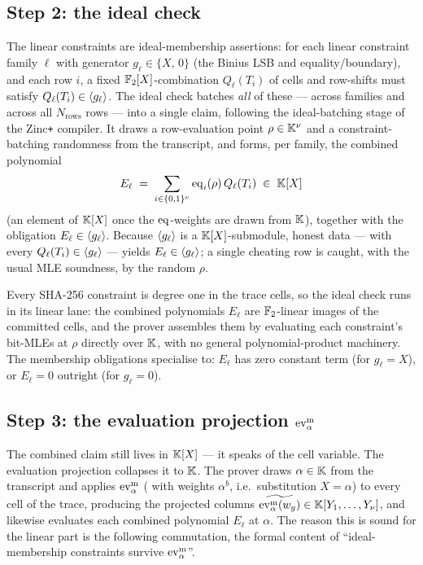 \subsection{Step 2: the ideal check}
\label{sec:ideal-check}

The linear constraints are ideal-membership assertions: for each linear
constraint family $\ell$ with generator $g_\ell\in\{X,\,0\}$
(the Binius LSB and equality/boundary), and each row $i$, a fixed
$\mathbb{F}_2[X]$-combination $Q_\ell(T_i)$ of cells and row-shifts must satisfy
$Q_\ell(T_i)\in\langle g_\ell \rangle$. The ideal check batches \emph{all} of
these --- across families and across all $N_{\mathrm{rows}}$ rows --- into a
single claim, following the ideal-batching stage of the Zinc\texttt{+}
compiler. It draws a row-evaluation point $\rho\in\mathbb{K}^{\nu}$ and a
constraint-batching randomness from the transcript, and forms, per
family, the combined polynomial
\[
  E_\ell \;=\; \sum_{i\in\{0,1\}^{\nu}} \operatorname{eq}_i(\rho)\,Q_\ell(T_i)\;\in\;\mathbb{K}[X]
\]
(an element of $\mathbb{K}[X]$ once the $\operatorname{eq}$-weights are drawn from $\mathbb{K}$),
together with the obligation $E_\ell\in\langle g_\ell \rangle$. Because $\langle g_\ell \rangle$
is a $\mathbb{K}[X]$-submodule, honest data --- with every $Q_\ell(T_i)\in\langle g_\ell \rangle$
--- yields $E_\ell\in\langle g_\ell \rangle$; a single cheating row is caught, with
the usual MLE soundness, by the random $\rho$.

\begin{remark}
\label{rem:native-ic}
Every SHA-256 constraint is degree one in the trace cells, so the ideal
check runs in its linear lane: the combined polynomials $E_\ell$ are
$\mathbb{F}_2$-linear images of the committed cells, and the prover assembles
them by evaluating each constraint's bit-MLEs at $\rho$ directly over $\mathbb{K}$,
with no general polynomial-product machinery. The membership obligations
specialise to: $E_\ell$ has zero constant term (for $g_\ell=X$), or
$E_\ell=0$ outright (for $g_\ell=0$).
\end{remark}

\subsection{Step 3: the evaluation projection $\operatorname{ev}^{\mathrm{m}}_{\alpha}$}
\label{sec:psi-alpha}

The combined claim still lives in $\mathbb{K}[X]$ --- it speaks of the cell
variable. The evaluation projection collapses it to $\mathbb{K}$. The prover draws
$\alpha\in\mathbb{K}$ from the transcript and applies $\operatorname{ev}^{\mathrm{m}}_{\alpha}$ (
with weights $\alpha^b$, i.e.\ substitution $X=\alpha$) to every cell of
the trace, producing the projected columns
$\widetilde{\operatorname{ev}^{\mathrm{m}}_{\alpha}(w_g)}\in\mathbb{K}[Y_1,\dots,Y_\nu]$, and likewise evaluates each
combined polynomial $E_\ell$ at $\alpha$. The reason this is sound for the
linear part is the following commutation, the formal content of
``ideal-membership constraints survive $\operatorname{ev}^{\mathrm{m}}_{\alpha}$''.


